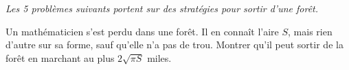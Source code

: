 \emph{Les 5 problèmes suivants portent sur des stratégies pour sortir d'une forêt.}

Un mathématicien s'est perdu dans une forêt. Il en connaît l'aire $S$, mais rien d'autre sur sa forme, sauf qu'elle n'a pas de trou. Montrer qu'il peut sortir de la forêt en marchant au plus $2\sqrt{\pi S}$ miles.
